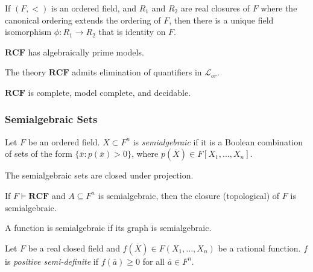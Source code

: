 \documentclass[
	fontsize=10pt, %
]{kaohandt}
\begin{document}
\begin{theorem}
    If $(F,<)$ is an ordered field,
    and $R_1$ and $R_2$ are real closures of $F$ where the canonical ordering extends the ordering of $F$,
    then there is a unique field isomorphism $\phi: R_1 \to R_2$ that is identity on $F$.
\end{theorem}

\begin{corollary}
    $\mathbf{RCF}$ has algebraically prime models.
\end{corollary}

\begin{theorem}
    The theory $\mathbf{RCF}$ admits elimination of quantifiers in $\mathcal{L}_{or}$.
\end{theorem}

\begin{corollary}
    $\mathbf{RCF}$ is complete, model complete, and decidable.
\end{corollary}

\subsubsection{Semialgebraic Sets}
\begin{definition}
    Let $F$ be an ordered field.
    $X \subset F^n$ is \emph{semialgebraic} if it is a Boolean combination of sets of the form $\{\overline{x}:p(\overline{x})>0\}$,
    where $p(\overline{X}) \in F[X_1,\dots,X_n]$.
\end{definition}

\begin{corollary}
    The semialgebraic sets are closed under projection.
\end{corollary}

\begin{corollary}
    If $F \models \mathbf{RCF}$ and $A \subseteq F^n$ is semialgebraic,
    then the closure (topological) of $F$ is semialgebraic.
\end{corollary}

A function is semialgebraic if its graph is semialgebraic.

\begin{definition}
    Let $F$ be a real closed field and 
    $f(\overline{X}) \in F(X_1,\dots,X_n)$ be a rational function.
    $f$ is \emph{positive semi-definite} if $f(\overline{a}) \ge 0$ for all $\overline{a} \in F^n$.
\end{definition}
\end{document}
